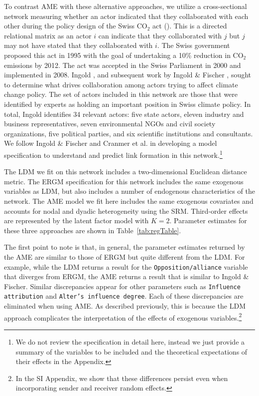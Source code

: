 \documentclass[12pt,pdflatex]{elsarticle}
\begin{document}
To contrast AME with these alternative approaches, we utilize a cross-sectional network measuring whether an actor indicated that they collaborated with each other during the policy design of the Swiss CO$_{2}$ act (\citealt{ingold:2008}). This is a directed relational matrix as an actor $i$ can indicate that they collaborated with $j$ but $j$ may not have stated that they collaborated with $i$. The Swiss government proposed this act in 1995 with the goal of undertaking a 10\% reduction in CO$_{2}$ emissions by 2012. The act was accepted in the Swiss Parliament in 2000 and implemented in 2008. Ingold \cite{ingold:2008}, and subsequent work by Ingold \& Fischer \cite{ingold:fischer:2014}, sought to determine what drives collaboration among actors trying to affect climate change policy. The set of actors included in this network are those that were identified by experts as holding an important position in Swiss climate policy. In total, Ingold identifies 34 relevant actors: five state actors, eleven industry and business representatives, seven environmental NGOs and civil society organizations, five political parties, and six scientific institutions and consultants. We follow Ingold \& Fischer and Cranmer et al. \cite{cranmer:etal:2016} in developing a model specification to understand and predict link formation in this network.\footnote{We do not review the specification in detail here, instead we just provide a summary of the variables to be included and the theoretical expectations of their effects in the Appendix.}

The LDM we fit on this network includes a two-dimensional Euclidean distance metric. The ERGM specification for this network includes the same exogenous variables as LDM, but also includes a number of endogenous characteristics of the network. The AME model we fit here includes the same exogenous covariates and accounts for nodal and dyadic heterogeneity using the SRM. Third-order effects are represented by the latent factor model with $K=2$. Parameter estimates for these three approaches are shown in Table~\ref{tab:regTable}.

The first point to note is that, in general, the parameter estimates returned by the AME are similar to those of ERGM but quite different from the LDM. For example, while the LDM returns a result for the \texttt{Opposition/alliance} variable that diverges from ERGM, the AME returns a result that is similar to Ingold \& Fischer. Similar discrepancies appear for other parameters such as \texttt{Influence attribution} and \texttt{Alter's influence degree}. Each of these discrepancies are eliminated when using AME. As described previously, this is because the LDM approach complicates the interpretation of the effects of exogenous variables.\footnote{In the SI Appendix, we show that these differences persist even when incorporating sender and receiver random effects.}
\end{document}
